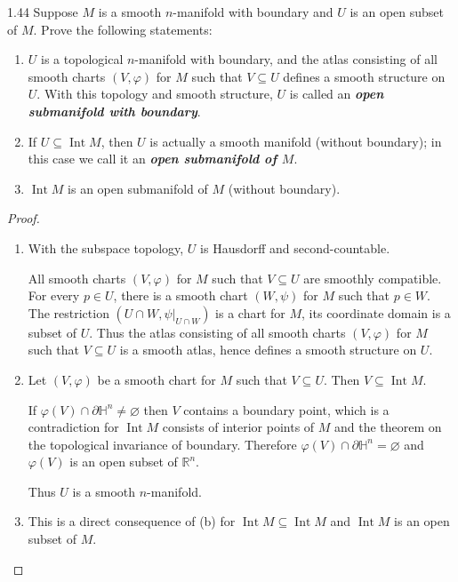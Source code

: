 \begin{exercise}{1.44}
    Suppose \( M \) is a smooth \( n \)-manifold with boundary and \( U \) is an open subset of \( M \). Prove the following statements:
    \begin{enumerate}[itemsep=0pt,label={(\alph*)}]
        \item \( U \) is a topological \( n \)-manifold with boundary, and the atlas consisting of all smooth charts \( (V, \varphi) \) for \( M \) such that \( V \subseteq U \) defines a smooth structure on \( U \). With this topology and smooth structure, \( U \) is called an \textbf{\emph{open submanifold with boundary}}.
        \item If \( U \subseteq \operatorname{Int} M \), then \( U \) is actually a smooth manifold (without boundary); in this case we call it an \textbf{\emph{open submanifold of \( M \)}}.
        \item \( \operatorname{Int} M \) is an open submanifold of \( M \) (without boundary).
    \end{enumerate}
\end{exercise}

\begin{proof}
    \begin{enumerate}[itemsep=0pt,label={(\alph*)}]
        \item With the subspace topology, \( U \) is Hausdorff and second-countable.

              All smooth charts \( (V, \varphi) \) for \( M \) such that \( V \subseteq U \) are smoothly compatible. For every \( p \in U \), there is a smooth chart \( (W, \psi) \) for \( M \) such that \( p \in W \). The restriction \( (U \cap W, \psi\vert_{U \cap W}) \) is a chart for \( M \), its coordinate domain is a subset of \( U \). Thus the atlas consisting of all smooth charts \( (V, \varphi) \) for \( M \) such that \( V \subseteq U \) is a smooth atlas, hence defines a smooth structure on \( U \).
        \item Let \( (V, \varphi) \) be a smooth chart for \( M \) such that \( V \subseteq U \). Then \( V \subseteq \operatorname{Int} M \).

              If \( \varphi(V) \cap \partial \mathbb{H}^{n} \ne \varnothing \) then \( V \) contains a boundary point, which is a contradiction for \( \operatorname{Int} M \) consists of interior points of \( M \) and the theorem on the topological invariance of boundary. Therefore \( \varphi(V) \cap \partial \mathbb{H}^{n} = \varnothing \) and \( \varphi(V) \) is an open subset of \( \mathbb{R}^{n} \).

              Thus \( U \) is a smooth \(n\)-manifold.
        \item This is a direct consequence of (b) for \( \operatorname{Int} M \subseteq \operatorname{Int} M \) and \( \operatorname{Int} M \) is an open subset of \( M \).
    \end{enumerate}
\end{proof}


